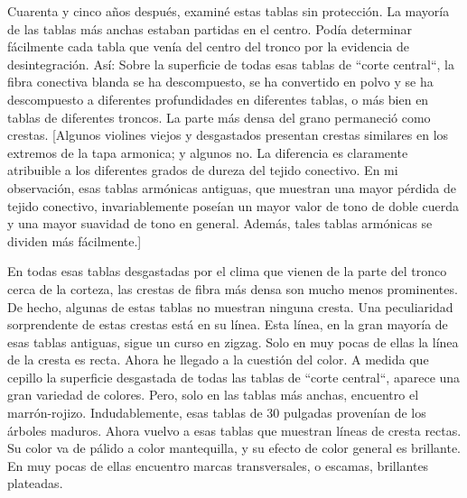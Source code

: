 \documentclass[12pt]{book}
\begin{document}
Cuarenta y cinco años después, examiné estas tablas sin protección. La mayoría de las tablas más anchas estaban partidas en el centro. Podía determinar fácilmente cada tabla que venía del centro del tronco por la evidencia de desintegración. Así: Sobre la superficie de todas esas tablas de ``corte central``, la fibra conectiva blanda se ha descompuesto, se ha convertido en polvo y se ha descompuesto a diferentes profundidades en diferentes tablas, o más bien en tablas de diferentes troncos. La parte más densa del grano permaneció como crestas. [Algunos violines viejos y desgastados presentan crestas similares en los extremos de la tapa armonica; y algunos no. La diferencia es claramente atribuible a los diferentes grados de dureza del tejido conectivo. En mi observación, esas tablas armónicas antiguas, que muestran una mayor pérdida de tejido conectivo, invariablemente poseían un mayor valor de tono de doble cuerda y una mayor suavidad de tono en general. Además, tales tablas armónicas se dividen más fácilmente.]

En todas esas tablas desgastadas por el clima que vienen de la parte del tronco cerca de la corteza, las crestas de fibra más densa son mucho menos prominentes. De hecho, algunas de estas tablas no muestran ninguna cresta. Una peculiaridad sorprendente de estas crestas está en su línea. Esta línea, en la gran mayoría de esas tablas antiguas, sigue un curso en zigzag. Solo en muy pocas de ellas la línea de la cresta es recta. Ahora he llegado a la cuestión del color. A medida que cepillo la superficie desgastada de todas las tablas de ``corte central``, aparece una gran variedad de colores. Pero, solo en las tablas más anchas, encuentro el marrón-rojizo. Indudablemente, esas tablas de 30 pulgadas provenían de los árboles maduros. Ahora vuelvo a esas tablas que muestran líneas de cresta rectas. Su color va de pálido a color mantequilla, y su efecto de color general es brillante. En muy pocas de ellas encuentro marcas transversales, o escamas, brillantes plateadas.
\end{document}
